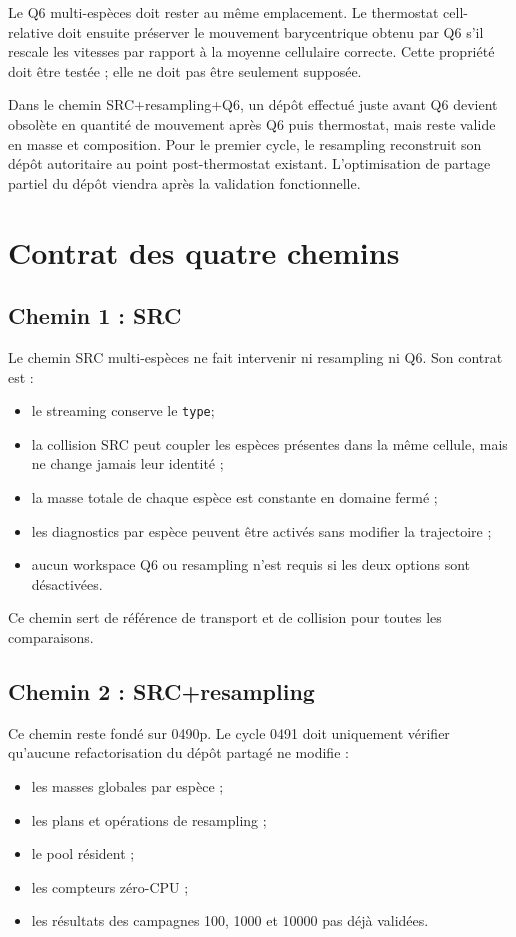 \documentclass[11pt,a4paper]{article}
\newcommand{\code}[1]{\texttt{#1}}
\begin{document}
Le Q6 multi-espèces doit rester au même emplacement. Le thermostat cell-relative doit ensuite préserver le mouvement barycentrique obtenu par Q6 s'il rescale les vitesses par rapport à la moyenne cellulaire correcte. Cette propriété doit être testée ; elle ne doit pas être seulement supposée.

Dans le chemin SRC+resampling+Q6, un dépôt effectué juste avant Q6 devient obsolète en quantité de mouvement après Q6 puis thermostat, mais reste valide en masse et composition. Pour le premier cycle, le resampling reconstruit son dépôt autoritaire au point post-thermostat existant. L'optimisation de partage partiel du dépôt viendra après la validation fonctionnelle.

\section{Contrat des quatre chemins}

\subsection{Chemin 1 : SRC}

Le chemin SRC multi-espèces ne fait intervenir ni resampling ni Q6. Son contrat est :
\begin{itemize}
  \item le streaming conserve le \code{type};
  \item la collision SRC peut coupler les espèces présentes dans la même cellule, mais ne change jamais leur identité ;
  \item la masse totale de chaque espèce est constante en domaine fermé ;
  \item les diagnostics par espèce peuvent être activés sans modifier la trajectoire ;
  \item aucun workspace Q6 ou resampling n'est requis si les deux options sont désactivées.
\end{itemize}

Ce chemin sert de référence de transport et de collision pour toutes les comparaisons.

\subsection{Chemin 2 : SRC+resampling}

Ce chemin reste fondé sur 0490p. Le cycle 0491 doit uniquement vérifier qu'aucune refactorisation du dépôt partagé ne modifie :
\begin{itemize}
  \item les masses globales par espèce ;
  \item les plans et opérations de resampling ;
  \item le pool résident ;
  \item les compteurs zéro-CPU ;
  \item les résultats des campagnes 100, 1000 et 10000 pas déjà validées.
\end{itemize}
\end{document}
